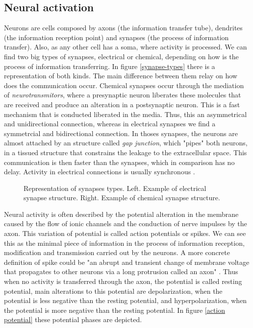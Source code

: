 \subsection{Neural activation}
Neurons are cells composed by axons (the information transfer tube), dendrites (the information reception point) and synapses (the process of information transfer). Also, as any other cell has a soma, where activity is processed. %
We can find two big types of synapses, electrical or chemical, depending on how is the process of information transferring. In figure \ref{synapse-types} there is a representation of both kinds. The main difference between them relay on how does the communication occur. Chemical synapses occur through the mediation of \textit{neurotransmitors}, where a presynaptic neuron liberates these molecules that are received and produce an alteration in a postsynaptic neuron. This is a fast mechanism that is conducted liberated in the media. Thus, this an asymmetrical and unidirectional connection, whereas in electrical synapses we find a symmetrcial and bidirectional connection. In thoses synapses, the neurons are almost attached by an structure called \textit{gap junction}, which "pipes" both neurons, in a tissued structure that constrains the leakage to the extracellular space. This communication is then faster than the synapses, which in comparison has no delay. Activity in electrical connections is usually synchronous \cite{levitan_neuron_2002}.

\begin{figure}[hbt!]
    \centering
    \caption{Representation of synapses types. Left. Example of electrical synapse structure. Right. Example of chemical synapse structure.}
    \label{fig:synapse-types}
\end{figure}

Neural activity is often described by the potential alteration in the membrane caused by the flow of ionic channels and the conduction of nerve impulses by the axon. This variation of potential is called action potentials or spikes. We can see this as the minimal piece of information in the process of information reception, modification and transmission carried out by the neurons. A more concrete definition of spike could be "an abrupt and transient change of membrane voltage that propagates to other neurons via a long protrusion called an axon" \cite{izhikevich_dynamical_2007}. Thus when no activity is transferred through the axon, the potential is called resting potential, main alterations to this potential are depolarization, when the potential is less negative than the resting potential, and hyperpolarization, when the potential is more negative than the resting potential. In figure \ref{action potential} these potential phases are depicted. 

